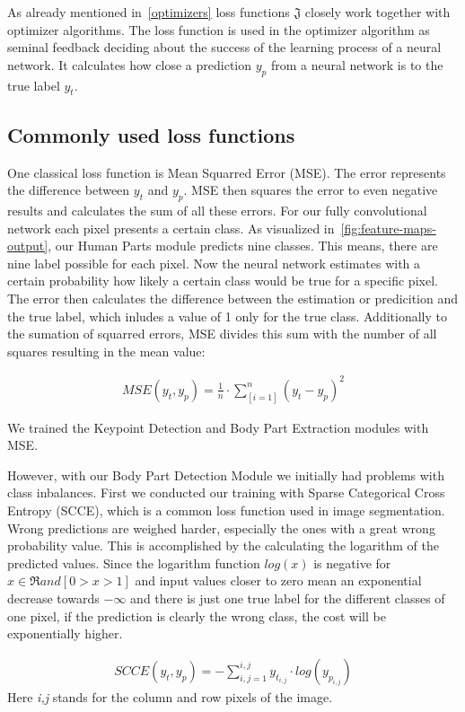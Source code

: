 As already mentioned in~\autoref{optimizers} loss functions $\mathfrak{J}$ closely work together with optimizer algorithms.
The loss function is used in the optimizer algorithm as seminal feedback deciding about the success of the learning process of a
neural network.
It calculates how close a prediction $y_p$ from a neural network is to the true label $y_t$.

\subsection{Commonly used loss functions}
One classical loss function is Mean Squarred Error (MSE).
The error represents the difference between $y_t$ and $y_p$.
MSE then squares the error to even negative results and calculates the sum of all these errors.
For our fully convolutional network each pixel presents a certain class.
As visualized in~\ref{fig:feature-maps-output}, our Human Parts module predicts nine classes.
This means, there are nine label possible for each pixel.
Now the neural network estimates with a certain probability how likely a certain class would be true for a specific pixel.
The error then calculates the difference between the estimation or predicition and the true label, which inludes a
value of 1 only for the true class.
Additionally to the sumation of squarred errors, MSE divides this sum with the number of all squares resulting in the mean
value:

\begin{align}
    MSE(y_t,y_p) = \frac{1}{n}\cdot\sum_[i=1]^n(y_t-y_p)^2
\end{align}

We trained the Keypoint Detection and Body Part Extraction modules with MSE.

However, with our Body Part Detection Module we initially had problems with class inbalances.
First we conducted our training with Sparse Categorical Cross Entropy (SCCE), which is a common loss function used in image
segmentation.
Wrong predictions are weighed harder, especially the ones with a great wrong probability value.
This is accomplished by the calculating the logarithm of the predicted values.
Since the logarithm function $log(x)$ is negative for $x \in \Re and [0>x>1]$ and input values closer to zero mean
an exponential decrease towards $-\infty$ and there is just one true label for the different classes of one pixel, if
the prediction is clearly the wrong class, the cost will be exponentially higher.

\begin{align}
    SCCE(y_t,y_p) = -\sum_{i,j=1}^{i,j}y_{t_{i,j}}\cdot log(y_{p_{i,j}})
\end{align}
Here \textit{i,j} stands for the column and row pixels of the image.


